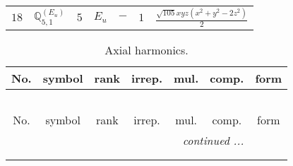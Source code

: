 \documentclass[fleqn,10pt,landscape]{article}
\begin{document}
\begin{itemize}
\begin{center}
\begin{longtable}{ccccccc}
$ 18 $ & $ \mathbb{Q}_{5,1}^{(E_{u})} $ & $ 5 $ & $ E_{u} $ & $ - $ & $ 1 $ & $ \frac{\sqrt{105} x y z \left(x^{2} + y^{2} - 2 z^{2}\right)}{2} $ \\
\end{longtable}
\end{center}
\begin{center}
\renewcommand{\arraystretch}{1.3}
\begin{longtable}{ccccccc}
\caption{Axial harmonics.}
 \\
 \hline \hline
No. & symbol & rank & irrep. & mul. & comp. & form \\ \hline \endfirsthead

\multicolumn{6}{l}{\tablename\ \thetable{}} \\
 \hline \hline
No. & symbol & rank & irrep. & mul. & comp. & form \\ \hline \endhead

 \hline \hline
\multicolumn{6}{r}{\footnotesize\it continued ...} \\ \endfoot

 \hline \hline
\multicolumn{6}{r}{} \\ \endlastfoot


\end{longtable}
\end{center}
\end{itemize}
\end{document}
